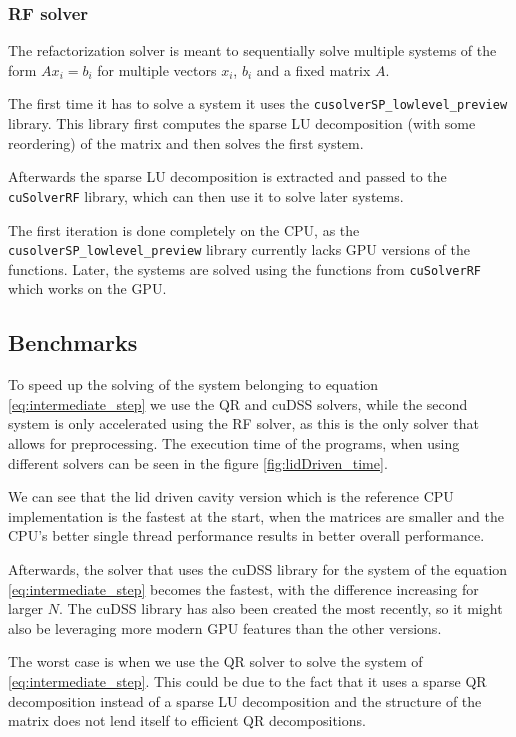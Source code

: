 \documentclass{article}
\begin{document}
\subsubsection{RF solver}
The refactorization solver is meant to sequentially solve multiple systems of the form 
\(A x_i = b_i\) for multiple vectors \(x_i\), \(b_i\) and a fixed matrix \(A\). 

The first time 
it has to solve a system it uses the \verb|cusolverSP_lowlevel_preview| library. This library 
first computes the sparse LU decomposition (with some reordering) of the matrix and then solves the 
first system.

Afterwards the sparse LU  decomposition is extracted and passed to the \verb|cuSolverRF| library,
which can then use it to solve later systems.

The first iteration is done completely on the CPU, as the \verb|cusolverSP_lowlevel_preview| library
currently lacks GPU versions of the functions. Later, the systems are solved using the functions 
from \verb|cuSolverRF| which works on the GPU.

\subsection{Benchmarks}
To speed up the solving of the system belonging to equation \ref{eq:intermediate_step} we use 
the QR and cuDSS solvers, while
the second system is only accelerated using the RF solver, as this is the only solver that allows 
for preprocessing. 
The execution time of the programs, when using different solvers can be seen in the
figure \ref{fig:lidDriven_time}.

We can see that the lid driven cavity version which is the reference CPU implementation 
is the fastest at the start, when the matrices are smaller and the CPU's better single 
thread performance results in better overall performance.

Afterwards, the solver that uses the cuDSS library for the system of the equation \ref{eq:intermediate_step} 
becomes the fastest, with the difference increasing for larger \(N\). The cuDSS library has also been 
created the most recently, so it might also be leveraging more modern GPU features than the other versions.

The worst case is when we use the QR solver to solve the system of \ref{eq:intermediate_step}.
This could be due to the fact that it uses a sparse QR decomposition instead of a sparse LU decomposition
and the structure of the matrix does not lend itself to efficient QR decompositions.
\end{document}
